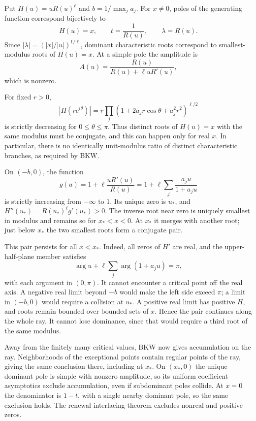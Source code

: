 \begin{proof*}
Put $H(u)=uR(u)^\ell$ and $b=1/\max_j a_j$.
For $x\ne0$, poles of the generating function correspond bijectively to
\[
 H(u)=x,\qquad t=\frac1{R(u)},\qquad \lambda=R(u).
\]
Since $|\lambda|=(|x|/|u|)^{1/\ell}$, dominant characteristic roots
correspond to smallest-modulus roots of $H(u)=x$.
At a simple pole the amplitude is
\[
 A(u)=\frac{R(u)}{R(u)+\ell uR'(u)},
\]
which is nonzero.

For fixed $r>0$,
\[
 |H(re^{i\theta})|
 =r\prod_j(1+2a_jr\cos\theta+a_j^2r^2)^{\ell/2}
\]
is strictly decreasing for $0\leq\theta\leq\pi$.
Thus distinct roots of $H(u)=x$ with the same modulus must be conjugate,
and this can happen only for real $x$.
In particular, there is no identically unit-modulus ratio of distinct
characteristic branches, as required by BKW.

On $(-b,0)$, the function
\[
 g(u)=1+\ell\frac{uR'(u)}{R(u)}
 =1+\ell\sum_j\frac{a_ju}{1+a_ju}
\]
is strictly increasing from $-\infty$ to $1$.
Its unique zero is $u_*$, and $H''(u_*)=R(u_*)^\ell g'(u_*)>0$.
The inverse root near zero is uniquely smallest in modulus and remains so
for $x_*<x<0$. At $x_*$ it merges with another root; just below $x_*$
the two smallest roots form a conjugate pair.

This pair persists for all $x<x_*$.
Indeed, all zeros of $H'$ are real, and the upper-half-plane member satisfies
\[
 \arg u+\ell\sum_j\arg(1+a_ju)=\pi,
\]
with each argument in $(0,\pi)$.
It cannot encounter a critical point off the real axis.
A negative real limit beyond $-b$ would make the left side exceed $\pi$;
a limit in $(-b,0)$ would require a collision at $u_*$.
A positive real limit has positive $H$, and roots remain bounded over
bounded sets of $x$. Hence the pair continues along the whole ray.
It cannot lose dominance, since that would require a third root of the
same modulus.

Away from the finitely many critical values, BKW now gives accumulation
on the ray. Neighborhoods of the exceptional points contain regular
points of the ray, giving the same conclusion there, including at $x_*$.
On $(x_*,0)$ the unique dominant pole is simple with nonzero amplitude,
so its uniform coefficient asymptotics exclude accumulation, even if
subdominant poles collide. At $x=0$ the denominator is $1-t$, with a
single nearby dominant pole, so the same exclusion holds.
The renewal interlacing theorem excludes nonreal and positive zeros.
\end{proof*}

